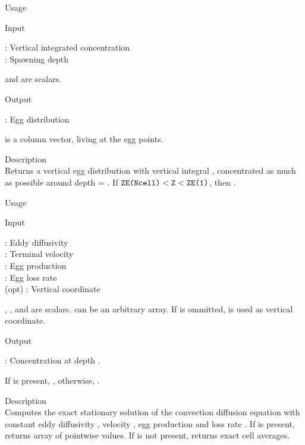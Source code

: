 {

\begin{tdesc}
\item[Usage] 
\item[Input]
  \begin{vartab}
   \> : \> Vertical integrated concentration \>  [eggs/m$^2$] \\
   \> : \> Spawning depth              \>       [m]
  \end{vartab}
   and  are scalars.
\item[Output]
  \begin{vartab}
    \> : \> Egg distribution     \>        [eggs/m$^3$]
  \end{vartab}
   is a column vector, living at the egg points.
\item[Description]\mbox{}\\
  Returns a vertical egg distribution  with vertical
  integral , concentrated as much as possible around 
  depth = .
  If ${\mbox{\texttt{ZE(Ncell)}}} < {\mbox{\texttt{Z}}} < {\mbox{\texttt{ZE(1)}}}$, then .
\end{tdesc}



\begin{tdesc}
\item[Usage] 
\item[Input]
  \begin{vartab}
     \> : \> Eddy diffusivity  \>  [\sqmps] \\
     \> : \> Terminal velocity \>  [\mps] \\
     \> : \> Egg production    \>  [eggs/m$^3$/s] \\
     \> : \> Egg loss rate  \>       [1/s] \\
     (opt) \> : \> Vertical coordinate \>  [m]
  \end{vartab}
  , ,  and  are scalars.  can 
  be an arbitrary array.
  If  is ommitted,  is used as vertical coordinate.
\item[Output]
  \begin{vartab}
     \> : \>  Concentration at depth .  \>   [eggs/m$^3$]
  \end{vartab}
  If  is present, ,
  otherwise, .
\item[Description]\mbox{}\\
   Computes the exact stationary solution of the
   convection diffusion equation with constant
   eddy diffusivity , velocity , egg production 
   and loss rate .
   If  is present, returns array of pointwise values.
   If  is not present, returns exact cell averages.
\end{tdesc}


}
